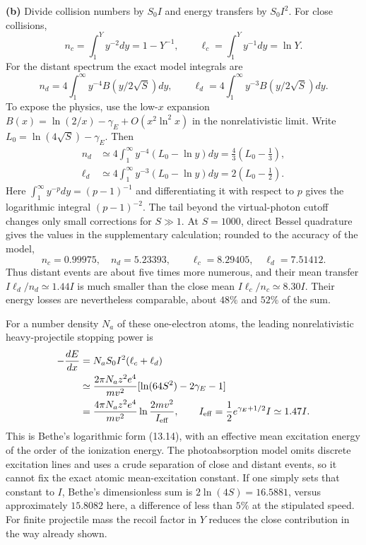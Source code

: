 \medskip\noindent\textbf{(b)} Divide collision numbers by $S_0I$
and energy transfers by $S_0I^2$.  For close collisions,
\[
n_c=\int_1^Yy^{-2}dy=1-Y^{-1},\qquad
\ell_c=\int_1^Yy^{-1}dy=\ln Y.
\]
For the distant spectrum the exact model integrals are
\[
n_d=4\int_1^\infty y^{-4}B(y/2\sqrt S)dy,\qquad
\ell_d=4\int_1^\infty y^{-3}B(y/2\sqrt S)dy.
\]
To expose the physics, use the low-$x$ expansion
$B(x)=\ln(2/x)-\gamma_E+O(x^2\ln^2x)$ in the nonrelativistic limit.
Write $L_0=\ln(4\sqrt S)-\gamma_E$.  Then
\begin{align*}
n_d&\simeq4\int_1^\infty y^{-4}(L_0-\ln y)dy
 =\frac43(L_0-\tfrac13),\\
\ell_d&\simeq4\int_1^\infty y^{-3}(L_0-\ln y)dy
 =2(L_0-\tfrac12).
\end{align*}
Here $\int_1^\infty y^{-p}dy=(p-1)^{-1}$ and differentiating it
with respect to $p$ gives the logarithmic integral
$(p-1)^{-2}$.  The tail beyond the virtual-photon cutoff changes
only small corrections for $S\gg1$.  At $S=1000$, direct Bessel
quadrature gives the values in the supplementary calculation;
rounded to the accuracy of the model,
\[
n_c=0.99975,\quad n_d=5.23393,\qquad
\ell_c=8.29405,\quad\ell_d=7.51412.
\]
Thus distant events are about five times more numerous, and their
mean transfer $I\ell_d/n_d\simeq1.44I$ is much smaller than the
close mean $I\ell_c/n_c\simeq8.30I$.  Their energy losses are
nevertheless comparable, about $48\%$ and $52\%$ of the sum.

For a number density $N_a$ of these one-electron atoms, the leading
nonrelativistic heavy-projectile stopping power is
\begin{align*}
-\frac{dE}{dx}
&=N_aS_0I^2(\ell_c+\ell_d)\\
&\simeq\frac{2\pi N_az^2e^4}{mv^2}
 [\ln(64S^2)-2\gamma_E-1]\\
&=\frac{4\pi N_az^2e^4}{mv^2}
 \ln\frac{2mv^2}{I_{\rm eff}},
\qquad
I_{\rm eff}=\frac12 e^{\gamma_E+1/2}I\simeq1.47I.
\end{align*}
This is Bethe's logarithmic form (13.14), with an effective mean
excitation energy of the order of the ionization energy.  The
photoabsorption model omits discrete excitation lines and uses a
crude separation of close and distant events, so it cannot fix the
exact atomic mean-excitation constant.  If one simply sets that
constant to $I$, Bethe's dimensionless sum is
$2\ln(4S)=16.5881$, versus approximately $15.8082$ here, a difference
of less than $5\%$ at the stipulated speed.  For finite projectile
mass the recoil factor in $Y$ reduces the close contribution in the
way already shown.

